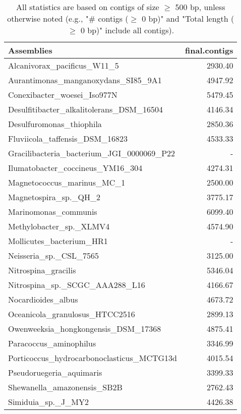 \documentclass[12pt,a4paper]{article}
\begin{document}
\begin{table}[ht]
\begin{center}
\caption{All statistics are based on contigs of size $\geq$ 500 bp, unless otherwise noted (e.g., "\# contigs ($\geq$ 0 bp)" and "Total length ($\geq$ 0 bp)" include all contigs).}
\begin{tabular}{|l*{1}{|r}|}
\hline
Assemblies & final.contigs \\ \hline
Alcanivorax\_pacificus\_W11\_5 & 2930.40 \\ \hline
Aurantimonas\_manganoxydans\_SI85\_9A1 & 4947.92 \\ \hline
Conexibacter\_woesei\_Iso977N & 5479.45 \\ \hline
Desulfitibacter\_alkalitolerans\_DSM\_16504 & 4146.34 \\ \hline
Desulfuromonas\_thiophila & 2850.36 \\ \hline
Fluviicola\_taffensis\_DSM\_16823 & 4533.33 \\ \hline
Gracilibacteria\_bacterium\_JGI\_0000069\_P22 & - \\ \hline
Ilumatobacter\_coccineus\_YM16\_304 & 4274.31 \\ \hline
Magnetococcus\_marinus\_MC\_1 & 2500.00 \\ \hline
Magnetospira\_sp.\_QH\_2 & 3775.17 \\ \hline
Marinomonas\_communis & 6099.40 \\ \hline
Methylobacter\_sp.\_XLMV4 & 4574.90 \\ \hline
Mollicutes\_bacterium\_HR1 & - \\ \hline
Neisseria\_sp.\_CSL\_7565 & 3125.00 \\ \hline
Nitrospina\_gracilis & 5346.04 \\ \hline
Nitrospina\_sp.\_SCGC\_AAA288\_L16 & 4166.67 \\ \hline
Nocardioides\_albus & 4673.72 \\ \hline
Oceanicola\_granulosus\_HTCC2516 & 2899.13 \\ \hline
Owenweeksia\_hongkongensis\_DSM\_17368 & 4875.41 \\ \hline
Paracoccus\_aminophilus & 3346.99 \\ \hline
Porticoccus\_hydrocarbonoclasticus\_MCTG13d & 4015.54 \\ \hline
Pseudoruegeria\_aquimaris & 3399.33 \\ \hline
Shewanella\_amazonensis\_SB2B & 2762.43 \\ \hline
Simiduia\_sp.\_J\_MY2 & 4426.38 \\ \hline

\end{tabular}
\end{center}
\end{table}
\end{document}
